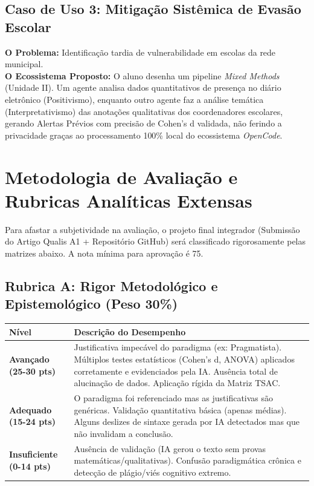 \documentclass[12pt,a4paper]{article}
\begin{document}
\subsection{Caso de Uso 3: Mitigação Sistêmica de Evasão Escolar}
\textbf{O Problema:} Identificação tardia de vulnerabilidade em escolas da rede municipal. \\
\textbf{O Ecossistema Proposto:} O aluno desenha um pipeline \textit{Mixed Methods} (Unidade II). Um agente analisa dados quantitativos de presença no diário eletrônico (Positivismo), enquanto outro agente faz a análise temática (Interpretativismo) das anotações qualitativas dos coordenadores escolares, gerando Alertas Prévios com precisão de Cohen's d validada, não ferindo a privacidade graças ao processamento 100\% local do ecossistema \textit{OpenCode}.

\newpage
\section{Metodologia de Avaliação e Rubricas Analíticas Extensas}

Para afastar a subjetividade na avaliação, o projeto final integrador (Submissão do Artigo Qualis A1 + Repositório GitHub) será classificado rigorosamente pelas matrizes abaixo. A nota mínima para aprovação é 75.

\subsection{Rubrica A: Rigor Metodológico e Epistemológico (Peso 30\%)}
\begin{table}[h]
\centering
\begin{tabular}{|p{}|p{}|}
\hline
\textbf{Nível} & \textbf{Descrição do Desempenho} \\
\hline
\textbf{Avançado (25-30 pts)} & Justificativa impecável do paradigma (ex: Pragmatista). Múltiplos testes estatísticos (Cohen's d, ANOVA) aplicados corretamente e evidenciados pela IA. Ausência total de alucinação de dados. Aplicação rígida da Matriz TSAC. \\
\hline
\textbf{Adequado (15-24 pts)} & O paradigma foi referenciado mas as justificativas são genéricas. Validação quantitativa básica (apenas médias). Alguns deslizes de sintaxe gerada por IA detectados mas que não invalidam a conclusão. \\
\hline
\textbf{Insuficiente (0-14 pts)} & Ausência de validação (IA gerou o texto sem provas matemáticas/qualitativas). Confusão paradigmática crônica e detecção de plágio/viés cognitivo extremo. \\
\hline
\end{tabular}
\end{table}
\end{document}

